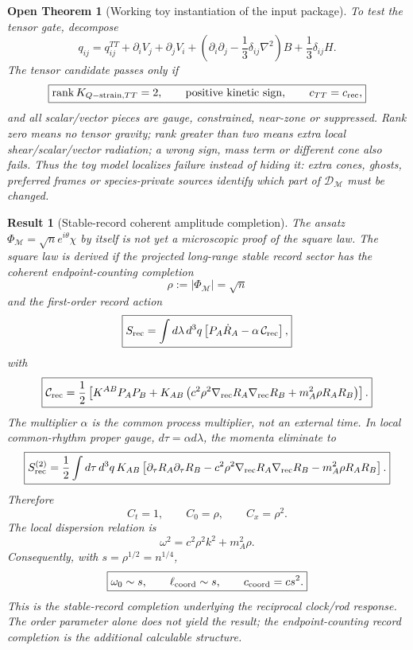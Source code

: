 \documentclass[11pt]{article}
\newtheorem{result}{Result}
\newtheorem{openthm}{Open Theorem}
\begin{document}
\begin{openthm}[Working toy instantiation of the input package]
To test the tensor gate, decompose
\[
\boxed{
q_{ij}
=
q_{ij}^{TT}
+\partial_iV_j+\partial_jV_i
+\left(\partial_i\partial_j-\frac13\delta_{ij}\nabla^2\right)B
+\frac13\delta_{ij}H.
}
\]
The tensor candidate passes only if
\[
\boxed{
\operatorname{rank}K_{Q{\rm -strain},TT}=2,
\qquad
\text{positive kinetic sign},
\qquad
c_{TT}=c_{\rm rec},
}
\]
and all scalar/vector pieces are gauge, constrained, near-zone or suppressed.
Rank zero means no tensor gravity; rank greater than two means extra local
shear/scalar/vector radiation; a wrong sign, mass term or different cone also
fails.  Thus the toy model localizes failure instead of hiding it: extra cones,
ghosts, preferred frames or species-private sources identify which part of
\(\mathcal D_{\mathcal M}\) must be changed.
\end{openthm}

\begin{result}[Stable-record coherent amplitude completion]
The ansatz \(\Phi_{\mathcal M}=\sqrt n e^{i\theta}\chi\) by itself is not yet
a microscopic proof of the square law.  The square law is derived if the
projected long-range stable record sector has the coherent endpoint-counting
completion
\[
\boxed{
\rho:=|\Phi_{\mathcal M}|=\sqrt n
}
\]
and the first-order record action
\[
\boxed{
S_{\rm rec}
=
\int d\lambda\,d^3q
\left[
P_A\dot R_A
-\alpha\,{\cal C}_{\rm rec}
\right],
}
\]
with
\[
\boxed{
{\cal C}_{\rm rec}
=
\frac12
\left[
K^{AB}P_AP_B
+K_{AB}
\left(
c^2\rho^2\nabla_{\rm rec}R_A\nabla_{\rm rec}R_B
+m_A^2\rho R_AR_B
\right)
\right].
}
\]
The multiplier \(\alpha\) is the common process multiplier, not an external
time.  In local common-rhythm proper gauge, \(d\tau=\alpha d\lambda\), the
momenta eliminate to
\[
\boxed{
S_{\rm rec}^{(2)}
=
\frac12
\int d\tau\,d^3q\,
K_{AB}
\left[
\partial_\tau R_A\partial_\tau R_B
-c^2\rho^2\nabla_{\rm rec}R_A\nabla_{\rm rec}R_B
-m_A^2\rho R_AR_B
\right].
}
\]
Therefore
\[
\boxed{
C_t=1,\qquad C_0=\rho,\qquad C_x=\rho^2.
}
\]
The local dispersion relation is
\[
\boxed{
\omega^2=c^2\rho^2k^2+m_A^2\rho.
}
\]
Consequently, with \(s=\rho^{1/2}=n^{1/4}\),
\[
\boxed{
\omega_0\sim s,\qquad
\ell_{\rm coord}\sim s,\qquad
c_{\rm coord}=cs^2.
}
\]
This is the stable-record completion underlying the reciprocal clock/rod
response.  The order parameter alone does not yield the result; the
endpoint-counting record completion is the additional calculable structure.
\end{result}
\end{document}
